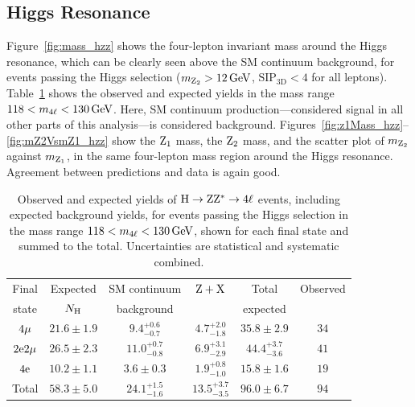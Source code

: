 \subsection{Higgs Resonance}

Figure~\ref{fig:mass_hzz} shows the four-lepton invariant mass around the Higgs resonance, which can be clearly seen above the SM continuum background, for events passing the Higgs selection ($m_{\mathrm{Z}_2} > 12\,\mathrm{Ge\hspace{-.08em}V}$, $\text{SIP}_\text{3D} < 4$ for all leptons).
Table~\ref{tab:results_hzz} shows the observed and expected yields in the mass range $118 < m_{4\ell} < 130\,\mathrm{Ge\hspace{-.08em}V}$.
Here, SM continuum production---considered signal in all other parts of this analysis---is considered background.
Figures~\ref{fig:z1Mass_hzz}--\ref{fig:mZ2VsmZ1_hzz} show the $\mathrm{Z}_1$ mass, the $\mathrm{Z}_2$ mass, and the scatter plot of $m_{\mathrm{Z}_2}$ against $m_{\mathrm{Z}_1}$, in the same four-lepton mass region around the Higgs resonance.
Agreement between predictions and data is again good.

\begin{table}[htbp]
  \begin{center}
    \caption[Expected and observed yields for Higgs boson production.]{
      Observed and expected yields of $\mathrm{H} \to \mathrm{Z}\mathrm{Z}^\ast \to 4\ell$ events, including expected background yields, for events passing the Higgs selection in the mass range $118 < m_{4\ell} < 130\,\mathrm{Ge\hspace{-.08em}V}$, shown for each final state and summed to the total.
      Uncertainties are statistical and systematic combined.
    }\label{tab:results_hzz}
    \begin{tabular}{cccccc}
      \toprule
      Final & Expected   &  SM continuum & $\mathrm{Z} + \mathrm{X}$  & Total     & Observed \\
      state & $N_\mathrm{H}$    &  background   &              & expected  &          \\
      \midrule
      \midrule
      $4\mathrm{\mu}$       & $ 21.6 \pm 1.9   $  & $ 9.4  ^{+0.6}_{-0.7}   $  & $ 4.7  ^{+2.0}_{-1.8}  $  & $ 35.8 \pm 2.9        $  & $ 34 $ \\
      $2\mathrm{e} 2\mathrm{\mu}$  & $ 26.5 \pm 2.3   $  & $ 11.0 ^{+0.7}_{-0.8}   $  & $ 6.9  ^{+3.1}_{-2.9}  $  & $ 44.4 ^{+3.7}_{-3.6} $  & $ 41 $ \\
      $4\mathrm{e}$       & $ 10.2 \pm 1.1   $  & $ 3.6  \pm 0.3          $  & $ 1.9  ^{+0.8}_{-1.0}  $  & $ 15.8 \pm 1.6        $  & $ 19 $ \\
      \midrule
      Total        & $ 58.3 \pm 5.0   $  & $ 24.1 ^{+1.5}_{-1.6}   $  & $ 13.5 ^{+3.7}_{-3.5}  $  & $ 96.0 \pm 6.7        $  & $ 94 $ \\
      \bottomrule
    \end{tabular}
  \end{center}
\end{table}

